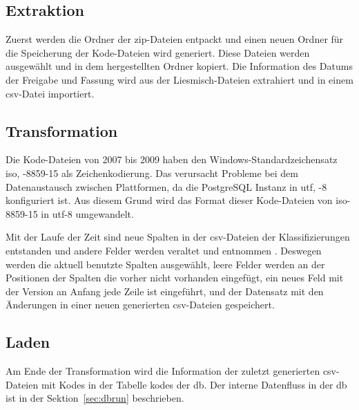\subsection{Extraktion} \label{subsec:extraction}

Zuerst werden die Ordner der \ac{zip}-Dateien entpackt und einen neuen Ordner für die Speicherung der Kode-Dateien wird generiert. Diese Dateien werden ausgewählt und in dem hergestellten Ordner kopiert. Die Information des Datums der Freigabe und Fassung wird aus der Liesmisch-Dateien extrahiert und in einem \ac{csv}-Datei importiert.


\subsection{Transformation} \label{subsec:transf}

Die Kode-Dateien von 2007 bis 2009 haben den Windows-Standardzeichensatz \acl{iso}, -8859-15 als Zeichenkodierung. Das verursacht Probleme bei dem Datenaustausch zwischen Plattformen, da die PostgreSQL Instanz in \acl{utf}, -8 konfiguriert ist. Aus diesem Grund wird das Format dieser Kode-Dateien von \ac{iso}-8859-15 in \ac{utf}-8 umgewandelt.

Mit der Laufe der Zeit sind neue Spalten in der \ac{csv}-Dateien der Klassifizierungen entstanden und andere Felder werden veraltet und entnommen \cite{readme13, readme17}. Deswegen werden die aktuell benutzte Spalten ausgewählt, leere Felder werden an der Positionen der Spalten die vorher nicht vorhanden eingefügt, ein neues Feld mit der Version an Anfang jede Zeile ist eingeführt, und der Datensatz mit den Änderungen in einer neuen generierten \ac{csv}-Dateien gespeichert.


\subsection{Laden} \label{subsec:load}

Am Ende der Transformation wird die Information der zuletzt generierten \ac{csv}-Dateien mit Kodes in der Tabelle \textsf{kodes} der \ac{db}. Der interne Datenfluss in der \ac{db} ist in der Sektion~\ref{sec:dbrun} beschrieben.